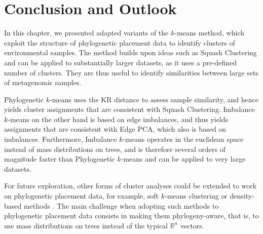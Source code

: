 
\section{Conclusion and Outlook}
\label{ch:Clustering:sec:ConclusionOutlook}

In this chapter, we presented adapted variants of the $k$-means method,
which exploit the structure of phylogenetic placement data to identify clusters of environmental samples.
The method builds upon ideas such as Squash Clustering and can be applied to substantially larger datasets,
as it uses a pre-defined number of clusters.
They are thus useful to identify similarities between large sets of metagenomic samples.

Phylogenetic $k$-means uses the KR distance to assess sample similarity,
and hence yields cluster assignments that are consistent with Squash Clustering.
Imbalance $k$-means on the other hand is based on edge imbalances,
and thus yields assignments that are consistent with Edge PCA, which also is based on imbalances.
Furthermore, Imbalance $k$-means operates in the euclidean space instead of mass distributions on trees,
and is therefore several orders of magnitude faster than Phylogenetic $k$-means
and can be applied to very large datasets.

For future exploration, other forms of cluster analyses could be extended to work on phylogenetic placement data,
for example, soft $k$-means clustering \cite{Dunn1973,Bezdek1981} or density-based methods \cite{Kriegel2011}.
The main challenge when adopting such methods to phylogenetic placement data consists in making them phylogeny-aware,
that is, to use mass distributions on trees instead of the typical $\mathbb{R}^n$ vectors.

